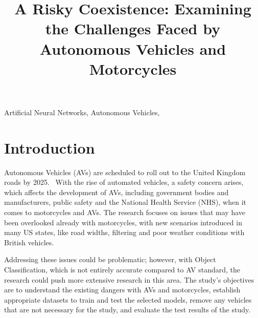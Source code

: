 \documentclass[conference]{IEEEtran}
\begin{document}
\title{A Risky Coexistence: Examining the Challenges Faced by Autonomous Vehicles and Motorcycles}

\author{
	}

\maketitle
\thispagestyle{plain}
\pagestyle{plain}

\begin{abstract}

\end{abstract}

\begin{IEEEkeywords}
	Artificial Neural Networks, Autonomous Vehicles, 
\end{IEEEkeywords}

\section{Introduction}
	 Autonomous Vehicles (AVs) are scheduled to roll out to the United Kingdom roads by 2025.~\cite{govuk_self-driving_2022} With the rise of automated vehicles, a safety concern arises, which affects the development of AVs, including government bodies and manufacturers, public safety and the National Health Service (NHS), when it comes to motorcycles and AVs. The research focuses on issues that may have been overlooked already with motorcycles, with new scenarios introduced in many US states, like road widths, filtering and poor weather conditions with British vehicles. 

	Addressing these issues could be problematic; however, with Object Classification, which is not entirely accurate compared to AV standard, the research could push more extensive research in this area. The study's objectives are to understand the existing dangers with AVs and motorcycles, establish appropriate datasets to train and test the selected models, remove any vehicles that are not necessary for the study, and evaluate the test results of the study.
	
\end{document}
